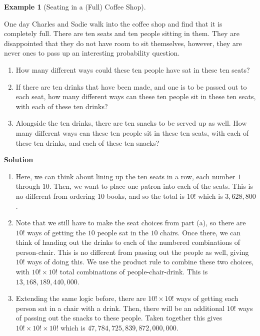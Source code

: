 \documentclass[
  letterpaper,
  DIV=11,
  numbers=noendperiod]{scrreprt}
\providecommand{\tightlist}{%
  \setlength{\itemsep}{0pt}\setlength{\parskip}{0pt}}\usepackage{longtable,booktabs,array}
\theoremstyle{definition}
\theoremstyle{definition}
\theoremstyle{definition}
\newtheorem{example}{Example}[chapter]
\theoremstyle{remark}
\begin{document}
\begin{example}[Seating in a (Full) Coffee
Shop]\protect\hypertarget{exm-factorial}{}\label{exm-factorial}

One day Charles and Sadie walk into the coffee shop and find that it is
completely full. There are ten seats and ten people sitting in them.
They are disappointed that they do not have room to sit themselves,
however, they are never ones to pass up an interesting probability
question.

\begin{enumerate}
\def\labelenumi{\alph{enumi}.}
\tightlist
\item
  How many different ways could these ten people have sat in these ten
  seats?
\item
  If there are ten drinks that have been made, and one is to be passed
  out to each seat, how many different ways can these ten people sit in
  these ten seats, with each of these ten drinks?
\item
  Alongside the ten drinks, there are ten snacks to be served up as
  well. How many different ways can these ten people sit in these ten
  seats, with each of these ten drinks, and each of these ten snacks?
\end{enumerate}

\begin{tcolorbox}[enhanced jigsaw, colback=white, breakable, rightrule=.15mm, leftrule=.75mm, toprule=.15mm, left=2mm, arc=.35mm, opacityback=0, bottomrule=.15mm]

\vspace{-3mm}\textbf{Solution}\vspace{3mm}

\begin{enumerate}
\def\labelenumi{\alph{enumi}.}
\item
  Here, we can think about lining up the ten seats in a row, each number
  \(1\) through \(10\). Then, we want to place one patron into each of
  the seats. This is no different from ordering \(10\) books, and so the
  total is \(10!\) which is \(3,628,800\).
\item
  Note that we still have to make the seat choices from part (a), so
  there are \(10!\) ways of getting the \(10\) people sat in the \(10\)
  chairs. Once there, we can think of handing out the drinks to each of
  the numbered combinations of person-chair. This is no different from
  passing out the people as well, giving \(10!\) ways of doing this. We
  use the product rule to combine these two choices, with
  \(10!\times 10!\) total combinations of people-chair-drink. This is
  \(13,168,189,440,000\).
\item
  Extending the same logic before, there are \(10!\times 10!\) ways of
  getting each person sat in a chair with a drink. Then, there will be
  an additional \(10!\) ways of passing out the snacks to these people.
  Taken together this gives \(10!\times 10!\times 10!\) which is
  \(47,784,725,839,872,000,000\).\footnotemark{}
\end{enumerate}


\end{tcolorbox}
\end{example}
\end{document}
